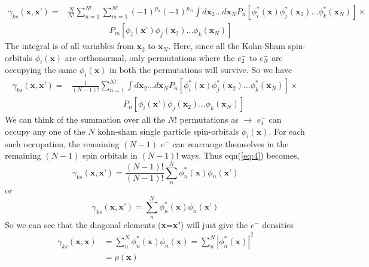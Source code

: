 \documentclass{article}
\begin{document}
\begin{Large}
\begin{flushleft}
  \begin{equation}\label{eq:3}
  \begin{split}
  \gamma_{ks}(\textbf{x},\textbf{x'}) = &\frac{N}{N!}\sum_{n=1}^{N!}\sum_{m=1}^{N!}(-1)^{p_n}(-1)^{p_m}\displaystyle{\int}d\textbf{x}_2...d\textbf{x}_N P_n[\phi_i^*(\textbf{x})\phi_j^*(\textbf{x}_2)...\phi_k^*(\textbf{x}_N)]\times\\&\,\,\,\,\,\,\,\,\,\,\,\,\,\,\,\,\,\,\,\,\,\,\,\,\,\,\,\,\,\,P_m[\phi_i(\textbf{x'})\phi_j(\textbf{x}_2)...\phi_k(\textbf{x}_N)] 
  \end{split}  
  \end{equation}
  The integral is of all variables from $\textbf{x}_2$ to $\textbf{x}_N$. Here, since all the Kohn-Sham spin-orbitals $\phi_i(\textbf{x})$ are orthonormal, only permutations where the $e^-_2$ to $e^-_N$ are occupying the same $\phi_i(\textbf{x})$ in both the permutations will survive. So we have
  \begin{equation}\label{eq:4}
  \begin{split}
  \gamma_{ks}(\textbf{x},\textbf{x'}) = &\frac{1}{(N-1)!}\sum_{n=1}^{N!}\displaystyle{\int}d\textbf{x}_2...d\textbf{x}_N P_n[\phi_i^*(\textbf{x})\phi_j^*(\textbf{x}_2)...\phi_k^*(\textbf{x}_N)]\times\\&\,\,\,\,\,\,\,\,\,\,\,\,\,\,\,\,\,\,\,\,\,\,\,\,\,\,\,\,\,\,\,\,\,\,\,\,\,P_n[\phi_i(\textbf{x'})\phi_j(\textbf{x}_2)...\phi_k(\textbf{x}_N)] 
  \end{split}
  \end{equation} 
  We can think of the summation over all the $N!$ permutations as $\rightarrow$ $e^-_1$ can occupy any one of the $N$ kohn-sham single particle spin-orbitals $\phi_i(\textbf{x})$. For each such occupation, the remaining $(N-1)$ $e^-$ can rearrange themselves in the remaining $(N-1)$ spin orbitals in $(N-1)!$ ways. Thus eqn(\ref{eq:4}) becomes,
  \begin{equation}\label{eq:5}
  \gamma_{ks}(\textbf{x},\textbf{x'}) = \frac{(N-1)!}{(N-1)!}\sum_n^N\phi_n^*(\textbf{x})\phi_n(\textbf{x'})
  \end{equation}
  or
  \begin{equation}\label{eq:6}
  \gamma_{ks}(\textbf{x},\textbf{x'}) = \sum_n^N\phi_n^*(\textbf{x})\phi_n(\textbf{x'})
  \end{equation}
  So we can see that the diagonal elements (\textbf{x}=\textbf{x'}) will just give the $e^-$ densities
  \begin{equation}\label{eq:7}
  \begin{split}
  \gamma_{ks}(\textbf{x},\textbf{x}) &= \sum_n^N\phi_n^*(\textbf{x})\phi_n(\textbf{x}) = \sum_n^N|\phi_n^*(\textbf{x})|^2\\
  &= \rho(\textbf{x})
  \end{split}
  \end{equation}
 \end{flushleft}
 \end{Large} 
  
\end{document}

